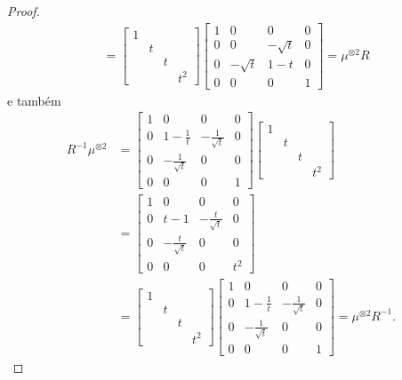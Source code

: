 \begin{proof}
\begin{align*}
    		&= \begin{bmatrix}
    		1 \\
    		& t \\
    		& & t \\
    		& & & t^2
    		\end{bmatrix}\begin{bmatrix}
    		1 & 0 & 0 & 0 \\
    		0 & 0 & -\sqrt{t} & 0 \\
    		0 & -\sqrt{t} & 1-t & 0 \\
    		0 & 0 & 0 & 1
    		\end{bmatrix} 
    		= \mu^{\otimes 2}R
		\end{align*}
		e também
		\begin{align*}
    		R^{-1}\mu^{\otimes 2} &= \begin{bmatrix}
    		1 & 0 & 0 & 0 \\
    		0 & 1 - \frac{1}{t} & -\frac{1}{\sqrt{t}} & 0 \\
    		0 & -\frac{1}{\sqrt{t}} & 0 & 0 \\
    		0 & 0 & 0 & 1
    		\end{bmatrix}\begin{bmatrix}
    		1 \\
    		& t \\
    		& & t \\
    		& & & t^2
    		\end{bmatrix} \\
    		&= \begin{bmatrix}
    		1 & 0 & 0 & 0 \\
    		0 & t-1 & -\frac{t}{\sqrt{t}} & 0 \\
    		0 & -\frac{t}{\sqrt{t}} & 0 &  0 \\
    		0 & 0 & 0 & t^2
    		\end{bmatrix} \\
    		&= \begin{bmatrix}
    		1 \\
    		& t \\
    		& & t \\
    		& & & t^2
    		\end{bmatrix}\begin{bmatrix}
    		1 & 0 & 0 & 0 \\
    		0 & 1 - \frac{1}{t} & -\frac{1}{\sqrt{t}} & 0 \\
    		0 & -\frac{1}{\sqrt{t}} & 0 & 0 \\
    		0 & 0 & 0 & 1
    		\end{bmatrix} = \mu^{\otimes 2}R^{-1}.

\end{align*}
\end{proof}

